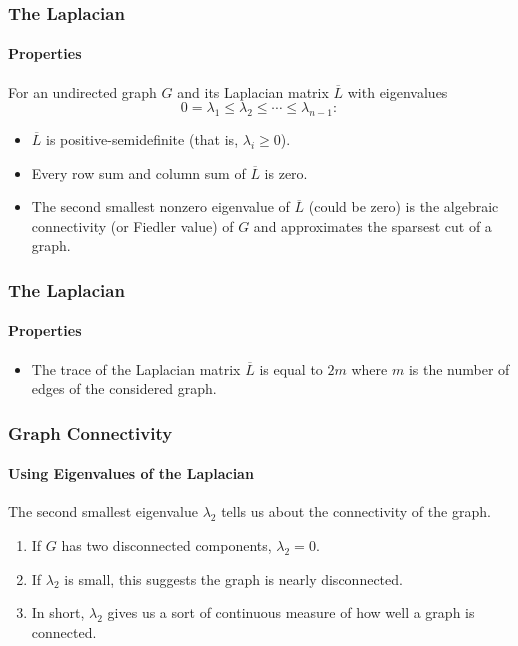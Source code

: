 \documentclass[aspectratio=43,leqno]{beamer}
\begin{document}
\begin{frame}
  \frametitle{The Laplacian}
  \framesubtitle{Properties}

  For an undirected graph $G$ and its Laplacian matrix $\overline{L}$ with eigenvalues 
\begin{displaymath}
0 = \lambda_1 \leq \lambda_2 \leq \cdots \leq \lambda_{n-1}:
\end{displaymath} 
\begin{itemize}
\item\label{item:3} $\overline{L}$ is positive-semidefinite (that is, $\lambda_i \geq 0$). \pause 
\item\label{item:28} Every row sum and column sum of $\overline{L}$ is zero. \pause
\item\label{item:29} The second smallest nonzero eigenvalue of $\overline{L}$ (could be zero) is the algebraic connectivity (or Fiedler value) of $G$ and approximates the sparsest cut of a graph. 
\end{itemize}
\end{frame}

\begin{frame}
  \frametitle{The Laplacian}
  \framesubtitle{Properties}
  
\begin{itemize}
\item The trace of the Laplacian matrix $\overline{L}$ is equal to $2m$ where $m$ is the number of edges of the considered graph. 
\end{itemize}
\end{frame}

\begin{frame}
  \frametitle{Graph Connectivity}
  \framesubtitle{Using Eigenvalues of the Laplacian}

  The second smallest eigenvalue $\lambda_2$ tells us about the connectivity of the graph. \pause
\begin{enumerate}
\item\label{item:31} If $G$ has two disconnected components, $\lambda_2 = 0$. \pause
\item\label{item:32} If $\lambda_2$ is small, this suggests the graph is nearly disconnected. \pause
\item\label{item:33} In short, $\lambda_2$ gives us a sort of continuous measure of how well a graph is connected.
\end{enumerate}
\end{frame}

\end{document}

